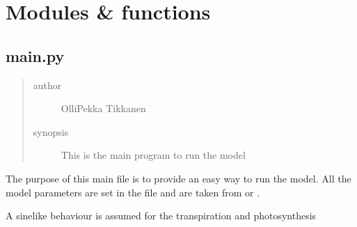 \documentclass[letterpaper,10pt,english]{sphinxmanual}
\begin{document}
\begin{sphinxVerbatim}[commandchars=\\\{\}]
 
\end{sphinxVerbatim}


\chapter{Modules \& functions}
\label{\detokenize{index:module-main}}\label{\detokenize{index:modules-functions}}

\section{main.py}
\label{\detokenize{index:main-py}}\begin{quote}\begin{description}
\item[{author}] \leavevmode
Olli\sphinxhyphen{}Pekka Tikkanen

\item[{synopsis}] \leavevmode
This is the main program to run the model

\end{description}\end{quote}

The purpose of this main file is to provide an easy way to run the model.
All the model parameters are set in the file and are taken from 
or .

A sine\sphinxhyphen{}like behaviour is assumed for the transpiration and photosynthesis



\renewcommand{\indexname}{Python Module Index}
\begin{sphinxtheindex}
\let\bigletter\sphinxstyleindexlettergroup
\bigletter{m}
\item\relax{}
\end{sphinxtheindex}

\renewcommand{\indexname}{Index}
\printindex
\end{document}
